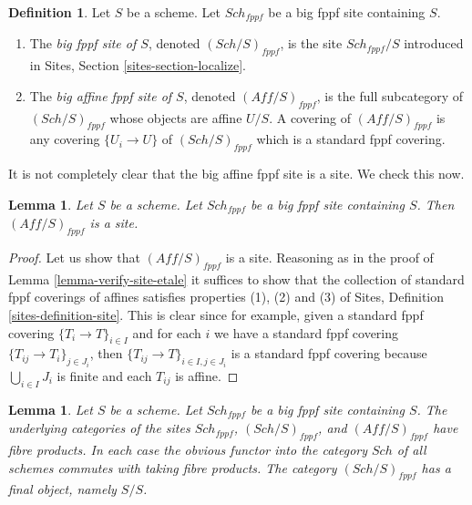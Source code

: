 \documentclass{stacks-project}
\theoremstyle{plain}
\newtheorem{lemma}[subsection]{Lemma}
\theoremstyle{definition}
\newtheorem{definition}[subsection]{Definition}
\theoremstyle{remark}
\numberwithin{equation}{subsection}
\def\Sch{\mathit{Sch}}
\begin{document}
\begin{definition}
\label{definition-big-small-fppf}
Let $S$ be a scheme. Let $\Sch_{fppf}$ be a big fppf
site containing $S$.
\begin{enumerate}
\item The {\it big fppf site of $S$}, denoted
$(\Sch/S)_{fppf}$, is the site $\Sch_{fppf}/S$
introduced in Sites, Section \ref{sites-section-localize}.
\item The {\it big affine fppf site of $S$}, denoted
$(\textit{Aff}/S)_{fppf}$, is the full subcategory of
$(\Sch/S)_{fppf}$ whose objects are affine $U/S$.
A covering of $(\textit{Aff}/S)_{fppf}$ is any covering
$\{U_i \to U\}$ of $(\Sch/S)_{fppf}$ which is a
standard fppf covering.
\end{enumerate}
\end{definition}

\noindent
It is not completely clear that
the big affine fppf site is a site. We check this now.

\begin{lemma}
\label{lemma-verify-site-fppf}
Let $S$ be a scheme. Let $\Sch_{fppf}$ be a big fppf
site containing $S$. Then $(\textit{Aff}/S)_{fppf}$ is a site.
\end{lemma}

\begin{proof}
Let us show that $(\textit{Aff}/S)_{fppf}$ is a site.
Reasoning as in the proof of Lemma \ref{lemma-verify-site-etale}
it suffices to show that the collection
of standard fppf coverings of affines satisfies properties
(1), (2) and (3) of
Sites, Definition \ref{sites-definition-site}.
This is clear since for example, given a standard fppf
covering $\{T_i \to T\}_{i\in I}$ and for each
$i$ we have a standard fppf covering $\{T_{ij} \to T_i\}_{j\in J_i}$, then
$\{T_{ij} \to T\}_{i \in I, j\in J_i}$ is a standard fppf covering
because $\bigcup_{i\in I} J_i$ is finite and each $T_{ij}$ is affine.
\end{proof}

\begin{lemma}
\label{lemma-fibre-products-fppf}
Let $S$ be a scheme. Let $\Sch_{fppf}$ be a big fppf
site containing $S$. The underlying categories of the sites
$\Sch_{fppf}$, $(\Sch/S)_{fppf}$,
and $(\textit{Aff}/S)_{fppf}$ have fibre products.
In each case the obvious functor into the category $\Sch$ of
all schemes commutes with taking fibre products. The category
$(\Sch/S)_{fppf}$ has a final object, namely $S/S$.
\end{lemma}
\end{document}
